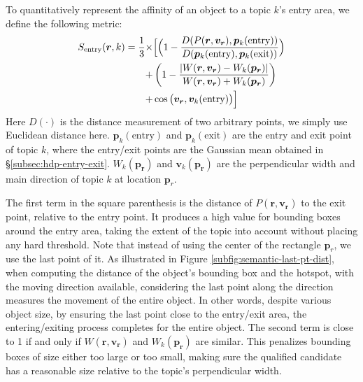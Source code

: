     To quantitatively represent the affinity of an object to a topic $k$'s entry area, we define the following metric:
    \begin{align}
        \begin{split}
        S_\text{entry}(\bm{r}, k) = \frac{1}{3}\times & \Bigl[\Bigl(1-\frac{D(P(\bm{r}, \bm{v_r}), \bm{p}_k(\text{entry}))}{D(\bm{p}_k(\text{entry}), \bm{p}_k(\text{exit}))}\Bigl) \\
        + & \left(1 - \frac{|W(\bm{r}, \bm{v_r}) - W_k(\bm{p_r})|}{W(\bm{r}, \bm{v_r}) + W_k(\bm{p_r})}\right) \\
        + & \cos\big(\bm{v_r}, \bm{v}_k(\text{entry})\big)\Bigl]\label{eq:entry_score}
        \end{split}
    \end{align}
    Here $D(\cdot)$ is the distance measurement of two arbitrary points, we simply use Euclidean distance here. 
    $\bm{p}_k(\text{entry})$ and $\bm{p}_k(\text{exit})$ are the entry and exit point of topic $k$, where the entry/exit points are the Gaussian mean obtained in \S\ref{subsec:hdp-entry-exit}. 
    $W_k(\bm{p_r})$ and $\bm{v}_k(\bm{p_r})$ are the perpendicular width and main direction of topic $k$ at location $\bm{p}_{r}$.
    
    The first term in the square parenthesis is the distance of $P(\bm{r}, \bm{v_r})$ to the exit point, relative to the entry point. It produces a high value for bounding boxes around the entry area, taking the extent of the topic into account without placing any hard threshold. 
    Note that instead of using the center of the rectangle $\bm{p}_{r}$, we use the last point of it. 
    As illustrated in Figure \ref{subfig:semantic-last-pt-dist}, when computing the distance of the object's bounding box and the hotspot, with the moving direction available, considering the last point along the direction measures the movement of the entire object. In other words, despite various object size, by ensuring the last point close to the entry/exit area, the entering/exiting process completes for the entire object.
    The second term is close to 1 if and only if $W(\bm{r}, \bm{v_r})$ and $W_k(\bm{p_r})$ are similar.
    This penalizes bounding boxes of size either too large or too small, making sure the qualified candidate has a reasonable size relative to the topic's perpendicular width. 




